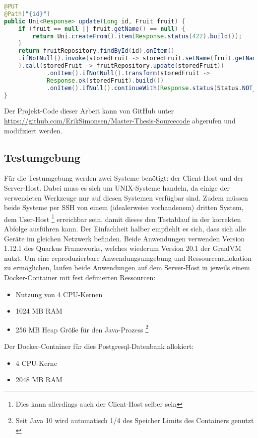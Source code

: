 \begin{lstlisting}[caption=Update Methode der reaktiven Anwendung, language=Java, captionpos=b, label=lst:update_reactive]
@PUT
@Path("{id}")
public Uni<Response> update(Long id, Fruit fruit) {
	if (fruit == null || fruit.getName() == null) {
		return Uni.createFrom().item(Response.status(422).build());
	}
	return fruitRepository.findById(id).onItem()
	.ifNotNull().invoke(storedFruit -> storedFruit.setName(fruit.getName())
	).call(storedFruit -> fruitRepository.update(storedFruit))
			.onItem().ifNotNull().transform(storedFruit ->
			Response.ok(storedFruit).build())
			.onItem().ifNull().continueWith(Response.status(Status.NOT_FOUND).build());
}
\end{lstlisting}
Der Projekt-Code dieser Arbeit kann von GitHub unter \url{https://github.com/ErikSimonsen/Master-Thesis-Sourcecode} abgerufen und modifiziert werden.

\subsection{Testumgebung}
\label{section:testumgebung}
Für die Testumgebung werden zwei Systeme benötigt: der Client-Host und der Server-Host.
Dabei muss es sich um UNIX-Systeme handeln, da einige der verwendeten Werkzeuge nur auf diesen Systemen verfügbar sind.
Zudem müssen beide Systeme per SSH von einem (idealerweise vorhandenem) dritten System, dem User-Host
\footnote{Dies kann allerdings auch der Client-Host selber sein}
erreichbar sein, damit dieses den Testablauf in der korrekten Abfolge ausführen kann.
Der Einfachheit halber empfiehlt es sich, dass sich alle Geräte im gleichen Netzwerk befinden.
Beide Anwendungen verwenden Version 1.12.1 des Quarkus Frameworks, welches wiederum Version 20.1 der GraalVM nutzt.
Um eine reproduzierbare Anwendungsumgebung und Ressourcenallokation zu ermöglichen, laufen beide Anwendungen auf dem Server-Host in
jeweils einem Docker-Container mit fest definierten Ressourcen:
\begin{itemize}
  \item Nutzung von 4 CPU-Kernen
  \item 1024 MB RAM
  \item 256 MB Heap Größe für den Java-Prozess
        \footnote{Seit Java 10 wird automatisch 1/4 des Speicher Limits des Containers genutzt \parencite{Java10ReleaseNotes}}
\end{itemize}
Der Docker-Container für dies Postgresql-Datenbank allokiert:
\begin{itemize}
  \item 4 CPU-Kerne
  \item 2048 MB RAM
\end{itemize}

